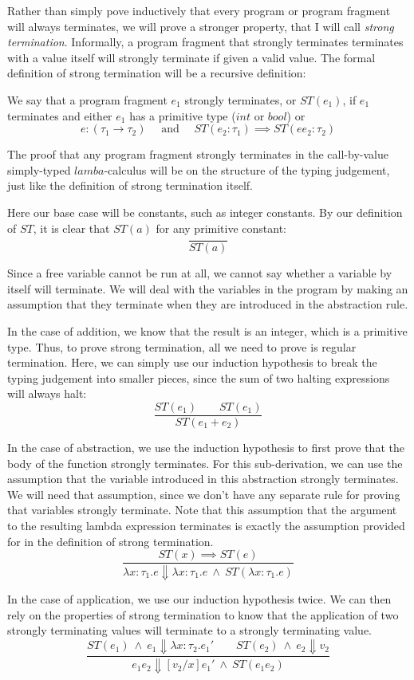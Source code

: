 \documentclass{article}
\begin{document}
Rather than simply pove inductively that every program or program fragment will
always terminates, we will prove a stronger property, that I will call
\emph{strong termination}.  Informally, a program fragment that strongly
terminates terminates with a value itself will strongly terminate if given a
valid value.  The formal definition of strong termination will be a recursive
definition:

We say that a program fragment $e_1$ strongly terminates, or $ST(e_1)$, if
$e_1$ terminates and either $e_1$ has a primitive type ($int$ or $bool$)
or
\[
e : (\tau_1 \rightarrow \tau_2) \quad \text{ and }
\quad ST(e_2: \tau_1) \implies ST(e e_2 : \tau_2)
\]

The proof that any program fragment strongly terminates in the call-by-value
simply-typed $lamba$-calculus will be on the structure of the typing judgement,
just like the definition of strong termination itself.

Here our base case will be constants, such as integer constants.
By our definition of $ST$, it is clear that $ST(a)$ for any primitive constant:
\[
\frac{}{ST(a)}
\]

Since a free variable cannot be run at all, we cannot say whether a variable
by itself will terminate.  We will deal with the variables in the program by 
making an assumption that they terminate when they are introduced in the
abstraction rule.

In the case of addition, we know that the result is an integer, which is a
primitive type.  Thus, to prove strong termination, all we need to prove is
regular termination. Here, we can simply use our induction hypothesis
to break the typing judgement into smaller pieces, since the sum of two halting
expressions will always halt:
\[
\frac{ST(e_1) \qquad ST(e_1)}
{ST(e_1 + e_2)}
\]

In the case of abstraction, we use the induction hypothesis to first prove that
the body of the function strongly terminates.  For this sub-derivation, we can
use the assumption that the variable introduced in this abstraction strongly
terminates.  We will need that assumption, since we don't have any separate
rule for proving that variables strongly terminate.
Note that this assumption that the argument to the resulting lambda expression
terminates is exactly the assumption provided for in the definition of strong
termination.
\[
\frac{ST(x) \implies ST(e)}
{\lambda x:\tau_1. e \Downarrow \lambda x:\tau_1. e
\ \wedge\ ST(\lambda x:\tau_1.e) }
\]

In the  case of application, we use our induction hypothesis twice.  We can
then rely on the properties of strong termination to know that the application
of two strongly terminating values will terminate to a strongly terminating
value.
\[
\frac{ST(e_1)\ \wedge\ e_1 \Downarrow \lambda x:\tau_2. e_1'
\qquad
ST(e_2)\ \wedge\ e_2 \Downarrow v_2 }
{e_1 e_2 \Downarrow [v_2/x]e_1' \ \wedge\ ST(e_1 e_2)}
\]
\end{document}
